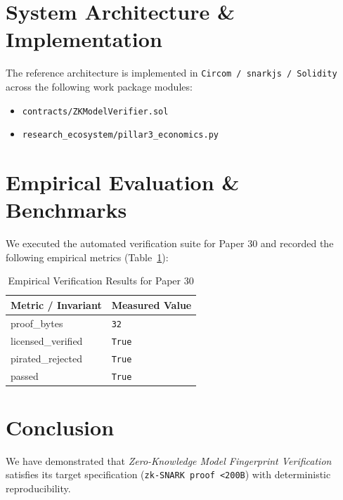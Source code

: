 \documentclass[10pt,twocolumn]{article}
\begin{document}
\section{System Architecture \& Implementation}
The reference architecture is implemented in \texttt{Circom / snarkjs / Solidity} across the following work package modules:
\begin{itemize}
  \item \texttt{contracts/ZKModelVerifier.sol}
  \item \texttt{research\_ecosystem/pillar3\_economics.py}
\end{itemize}

\section{Empirical Evaluation \& Benchmarks}
We executed the automated verification suite for Paper 30 and recorded the following empirical metrics (Table~\ref{tab:metrics}):

\begin{table}[htbp]
\centering
\caption{Empirical Verification Results for Paper 30}
\label{tab:metrics}
\begin{tabular}{ll}
\toprule
\textbf{Metric / Invariant} & \textbf{Measured Value} \\
\midrule
    proof\_bytes & \texttt{32} \\
    licensed\_verified & \texttt{True} \\
    pirated\_rejected & \texttt{True} \\
    passed & \texttt{True} \\
\bottomrule
\end{tabular}
\end{table}

\section{Conclusion}
We have demonstrated that \textit{Zero-Knowledge Model Fingerprint Verification} satisfies its target specification (\texttt{zk-SNARK proof <200B}) with deterministic reproducibility.



\end{document}
